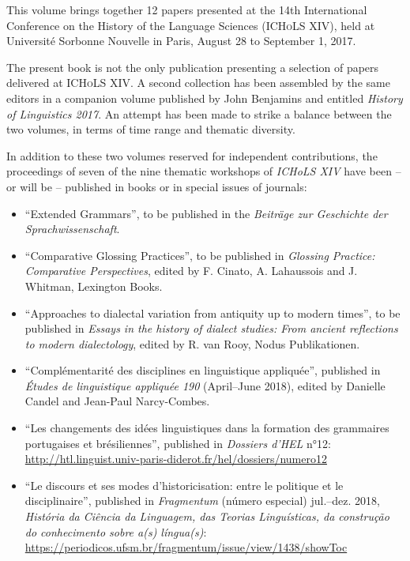 \begin{refsection}

This volume brings together 12 papers presented at the 14th International Conference on the History of the Language Sciences (\textsc{ICHoLS XIV}), held at Université Sorbonne Nouvelle in Paris, August 28 to September 1, 2017.

The present book is not the only publication presenting a selection of papers delivered at \textsc{ICHoLS XIV}. A second collection has been assembled by the same editors in a companion volume published by John Benjamins and entitled \emph{History of Linguistics 2017}. An attempt has been made to strike a balance between the two volumes, in terms of time range and thematic diversity.

In addition to these two volumes reserved for independent contributions, the proceedings of seven of the nine thematic workshops of \emph{ICHoLS XIV} have been -- or will be -- published in books or in special issues of journals:

\begin{itemize}
    \item ``Extended Grammars'', to be published in the \emph{Beiträge zur Geschichte der Sprachwissenschaft}.
    
    \item ``Comparative Glossing Practices'', to be published in \emph{Glossing Practice: Comparative Perspectives}, edited by F. Cinato, A. Lahaussois and J. Whitman, Lexington Books.
    
    \item ``Approaches to dialectal variation from antiquity up to modern times'', to be published in \emph{Essays in the history of dialect studies: From ancient reflections to modern dialectology}, edited by R. van Rooy, Nodus Publikationen.
    
    \item ``Complémentarité des disciplines en linguistique appliquée'', published in \emph{Études de linguistique appliquée 190} (April--June 2018), edited by Danielle Candel and Jean-Paul Narcy-Combes.
    
    \item ``Les changements des idées linguistiques dans la formation des grammaires portugaises et brésiliennes'', published in \emph{Dossiers d'HEL} n°12: \url{http://htl.linguist.univ-paris-diderot.fr/hel/dossiers/numero12}
    
    \item ``Le discours et ses modes d’historicisation: entre le politique et le disciplinaire'', published in \emph{Fragmentum} (número especial) jul.--dez. 2018, \emph{História da Ciência da Linguagem, das Teorias Linguísticas, da construção do conhecimento sobre a(s) língua(s)}: \url{https://periodicos.ufsm.br/fragmentum/issue/view/1438/showToc}
    

\end{itemize}
\end{refsection}
